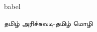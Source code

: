 babel\documentclass{article}
\begin{document}
\foreignlanguage{tamil}{தமிழ் அரிச்சுவடி-தமிழ் மொழி}
\end{document}
